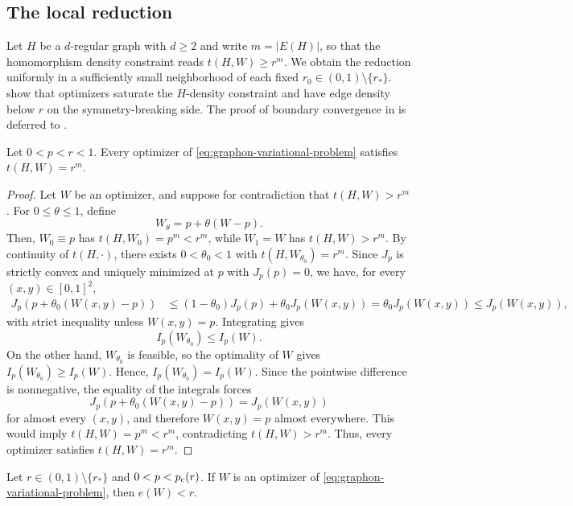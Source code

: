 \subsection{The local reduction}\label{sec:local-reduction}

Let $H$ be a $d$-regular graph with $d\ge2$ and write $m=|E(H)|$, so that
the homomorphism density constraint reads $t(H,W)\ge r^m$.
We obtain the reduction uniformly in a sufficiently small neighborhood of
each fixed $r_0\in(0,1)\setminus\{r_*\}$.
 show that optimizers
saturate the $H$-density constraint and have edge density below $r$ on the
symmetry-breaking side.  The proof of boundary convergence in
 is deferred to .

\begin{lemma}\label{lem:active-constraint}
Let $0<p<r<1$.  Every optimizer of \eqref{eq:graphon-variational-problem} satisfies
$t(H,W)=r^m$.
\end{lemma}

\begin{proof}
Let $W$ be an optimizer, and suppose for contradiction that $t(H,W)>r^m$.
For $0\le\theta\le1$, define
\[
  W_\theta=p+\theta(W-p).
\]
Then, $W_0\equiv p$ has $t(H,W_0)=p^m<r^m$, while $W_1=W$ has
$t(H,W)>r^m$.  By continuity of $t(H,\cdot)$, there exists
$0<\theta_0<1$ with $t(H,W_{\theta_0})=r^m$.  Since $J_p$ is strictly convex
and uniquely minimized at $p$ with $J_p(p) = 0$, we have, for every
$(x,y)\in[0,1]^2$,
\begin{align*}
  J_p(p+\theta_0(W(x,y)-p))
  & {}
  \le
  (1-\theta_0)J_p(p)+\theta_0J_p(W(x,y))
  =
  \theta_0J_p(W(x,y))
  {}
  \le
  J_p(W(x,y)),
\end{align*}
with strict inequality unless $W(x,y)=p$.  Integrating gives
\[
   I_p(W_{\theta_0}) \le I_p(W).
\]
On the other hand, $W_{\theta_0}$ is feasible, so the optimality of $W$ gives
$I_p(W_{\theta_0})\ge I_p(W)$.  Hence, $I_p(W_{\theta_0})=I_p(W)$.
Since the pointwise difference is nonnegative, the equality of the integrals forces
\[
  J_p(p+\theta_0(W(x,y)-p))=J_p(W(x,y))
\]
for almost every $(x,y)$, and therefore $W(x,y)=p$ almost everywhere.  This
would imply $t(H,W)=p^m<r^m$, contradicting $t(H,W)>r^m$.  Thus,  every
optimizer satisfies $t(H,W)=r^m$.
\end{proof}

\begin{lemma}\label{lem:edge-density-deficit}
Let $r\in(0,1)\setminus\{r_*\}$ and $0<p<p_{\mathrm c}(r)$.
If $W$ is an optimizer of \eqref{eq:graphon-variational-problem}, then $e(W)<r$.
\end{lemma}

